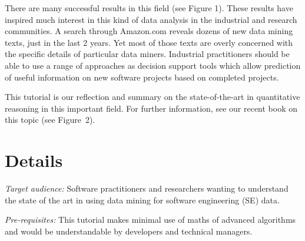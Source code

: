\documentclass[conference]{IEEEtran}
\begin{document}
There are many successful results in this field (see Figure 1).
       These results have inspired much interest in this kind of data analysis in the industrial and research communities. A search through Amazon.com reveals dozens of new data mining texts, just in the last 2 years.  Yet most of those texts are overly concerned with the specific details of particular data miners. Industrial practitioners should be able to use a range of approaches as decision support tools which allow prediction of useful information on new software projects based on completed projects. 
       
This tutorial is our reflection  and summary
on the state-of-the-art in quantitative reasoning in this important field. For further information, see our
recent book on this topic (see Figure~2).

\section{Details}   
       
{\em  Target audience: }Software practitioners and researchers wanting to understand the state of the art in using data mining for software engineering (SE) data.  
 
{\em Pre-requisites:} This tutorial makes minimal use of maths of advanced algorithms and would be understandable by  developers and technical managers. 
 
\end{document}
